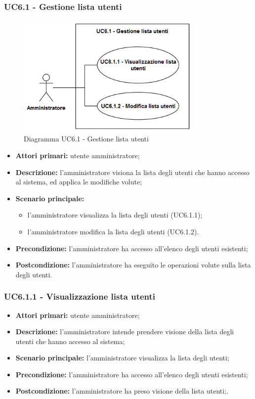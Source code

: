 \subsubsection{UC6.1 - Gestione lista utenti}
	\begin{figure}[H]
		\centering
		\includegraphics[width=9cm]{images/UC6.1.png}
		\caption{Diagramma UC6.1 - Gestione lista utenti}
	\end{figure}
	\begin{itemize}
		\item \textbf{Attori primari:} utente amministratore;
		\item \textbf{Descrizione:} l'amministratore visiona la lista degli utenti che hanno accesso al sistema, ed applica le modifiche volute;
		\item \textbf{Scenario principale:} 
			\begin{itemize}
				\item l'amministratore visualizza la lista degli utenti (UC6.1.1);
				\item l'amministratore modifica la lista degli utenti (UC6.1.2).
			\end{itemize}
		\item \textbf{Precondizione:} l'amministratore ha accesso all'elenco degli utenti esistenti;
		\item \textbf{Postcondizione:} l'amministratore ha eseguito le operazioni volute sulla lista degli utenti.
	\end{itemize}

\subsubsection{UC6.1.1 - Visualizzazione lista utenti}
\begin{itemize}
	\item \textbf{Attori primari:} utente amministratore;
	\item \textbf{Descrizione:} l'amministratore intende prendere visione della lista degli utenti che hanno accesso al sistema;
	\item \textbf{Scenario principale:} l'amministratore visualizza la lista degli utenti;
	\item \textbf{Precondizione:} l'amministratore ha accesso all'elenco degli utenti esistenti;
	\item \textbf{Postcondizione:} l'amministratore ha preso visione della lista utenti;.
\end{itemize}

